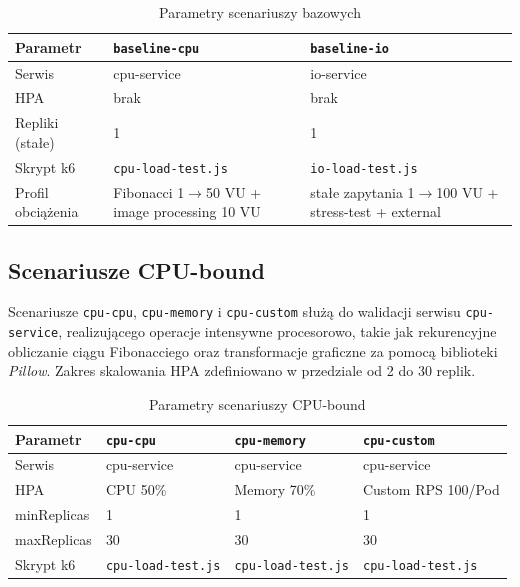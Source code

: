 \begin{table}[H]
  \centering
  \begin{tabularx}{\textwidth}{|l|X|X|}
    \hline
    \textbf{Parametr} & \texttt{baseline-cpu} & \texttt{baseline-io} \\
    \hline
    Serwis & cpu-service & io-service \\
    HPA & brak & brak \\
    Repliki (stałe) & 1 & 1 \\
    Skrypt k6 & \texttt{cpu-load-test.js} & \texttt{io-load-test.js} \\
    Profil obciążenia & Fibonacci 1$\rightarrow$50 VU + image processing 10 VU & stałe zapytania 1$\rightarrow$100 VU + stress-test + external \\
    \hline
  \end{tabularx}
  \caption{Parametry scenariuszy bazowych}
  \label{tab:baseline-scenarios}
\end{table}

\subsection{Scenariusze CPU-bound}

Scenariusze \texttt{cpu-cpu}, \texttt{cpu-memory} i \texttt{cpu-custom} służą do walidacji serwisu \texttt{cpu-service}, realizującego operacje intensywne procesorowo, takie jak rekurencyjne obliczanie ciągu Fibonacciego oraz transformacje graficzne za pomocą biblioteki \textit{Pillow}. Zakres skalowania HPA zdefiniowano w przedziale od 2 do 30 replik.

\begin{table}[H]
  \centering
  \begin{tabularx}{\textwidth}{|l|X|X|X|}
    \hline
    \textbf{Parametr} & \texttt{cpu-cpu} & \texttt{cpu-memory} & \texttt{cpu-custom} \\
    \hline
    Serwis & cpu-service & cpu-service & cpu-service \\
    HPA & CPU 50\% & Memory 70\% & Custom RPS 100/Pod \\
    minReplicas & 1 & 1 & 1 \\
    maxReplicas & 30 & 30 & 30 \\
    Skrypt k6 & \texttt{cpu-load-test.js} & \texttt{cpu-load-test.js} & \texttt{cpu-load-test.js} \\
    \hline
  \end{tabularx}
  \caption{Parametry scenariuszy CPU-bound}
  \label{tab:cpu-scenarios}
\end{table}

